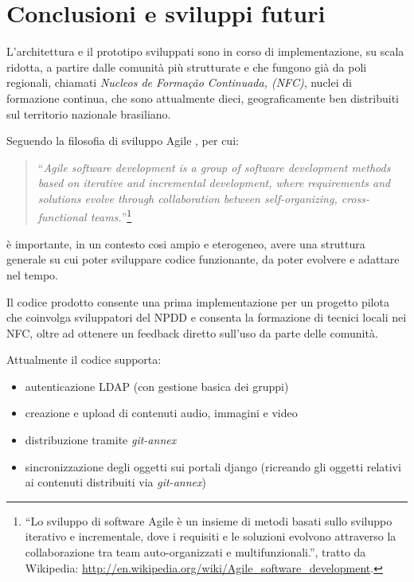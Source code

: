 
\chapter{Conclusioni e sviluppi futuri}
\label{Capitolo5}

L'architettura e il prototipo sviluppati sono in corso di
implementazione, su scala ridotta, a partire dalle comunità più
strutturate e che fungono già da poli regionali, chiamati
\emph{Nucleos de Formação Continuada, (NFC)}, nuclei di formazione
continua, che sono attualmente dieci, geograficamente ben distribuiti
sul territorio nazionale brasiliano.

Seguendo la filosofia di sviluppo Agile \citep{Agile}, per cui: 

\begin{quote}
  ``\emph{Agile software development is a group of software
    development methods based on iterative and incremental
    development, where requirements and solutions evolve through
    collaboration between self-organizing, cross-functional
    teams.}''\footnote{``Lo sviluppo di software Agile è un insieme di
    metodi basati sullo sviluppo iterativo e incrementale, dove i
    requisiti e le soluzioni evolvono attraverso la collaborazione tra
    team auto-organizzati e multifunzionali.'', tratto da Wikipedia:
    \url{http://en.wikipedia.org/wiki/Agile_software_development}.}
\end{quote}

è importante, in un contesto cosi ampio e eterogeneo, avere una
struttura generale su cui poter sviluppare codice funzionante, da
poter evolvere e adattare nel tempo.

Il codice prodotto consente una prima implementazione per un progetto
pilota che coinvolga sviluppatori del NPDD e consenta la formazione di
tecnici locali nei NFC, oltre ad ottenere un feedback diretto sull'uso
da parte delle comunità.

Attualmente il codice supporta:
\begin{itemize}
\item autenticazione LDAP (con gestione basica dei gruppi)
\item creazione e upload di contenuti audio, immagini e video
\item distribuzione tramite \emph{git-annex}
\item sincronizzazione degli oggetti sui portali django (ricreando gli
  oggetti relativi ai contenuti distribuiti via \emph{git-annex})
\end{itemize}


